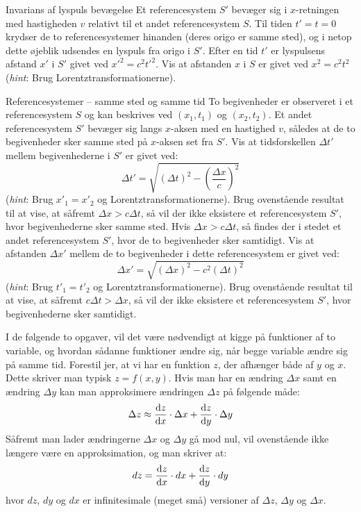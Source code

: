 \documentclass[crop=false, class=memoir]{standalone}
\begin{document}
\begin{opgave}[2]{Invarians af lyspuls bevægelse}
	Et referencesystem $S'$ bevæger sig i $x$-retningen med hastigheden $v$ relativt til et andet referencesystem $S$. Til tiden $t'=t=0$ krydser de to referencesystemer hinanden (deres origo er samme sted), og i netop dette øjeblik udsendes en lyspuls fra origo i $S'$. Efter en tid $t'$ er lyspulsens afstand $x'$ i $S'$ givet ved $x'^2 = c^2 t'^2$. 
	\opg Vis at afstanden $x$ i $S$ er givet ved $x^2 = c^2 t^2$ (\emph{hint}: Brug Lorentztransformationerne). 
\end{opgave}

\begin{opgave}[3]{Referencesystemer -- samme sted og samme tid}
	To begivenheder er observeret i et referencesystem $S$ og kan beskrives ved $\left( x_1 , t_1 \right)$ og $\left( x_2 , t_2 \right)$. Et andet referencesystem $S'$ bevæger sig langs $x$-aksen med en hastighed $v$, således at de to begivenheder sker samme sted på $x$-aksen set fra $S'$.
	\opg Vis at tidsforskellen $\Delta t'$ mellem begivenhederne i $S'$ er givet ved:
	$$\Delta t' = \sqrt{\left( \Delta t \right)^2 - \left( \frac{\Delta x}{c} \right)^2}$$
	(\emph{hint}: Brug $x'_1 = x'_2$ og Lorentztransformationerne).
	\opg Brug ovenstående resultat til at vise, at såfremt $\Delta x > c \Delta t$, så vil der ikke eksistere et referencesystem $S'$, hvor begivenhederne sker samme sted.
	\opg Hvis $\Delta x > c \Delta t$, så findes der i stedet et andet referencesystem $S'$, hvor de to begivenheder sker samtidigt. Vis at afstanden $\Delta x'$ mellem de to begivenheder i dette referencesystem er givet ved:
	$$\Delta x' = \sqrt{\left( \Delta x \right)^2 - c^2 \left( \Delta t \right)^2}$$
	(\emph{hint}: Brug $t'_1 = t'_2$ og Lorentztransformationerne).
	\opg Brug ovenstående resultat til at vise, at såfremt $c \Delta t > \Delta x$, så vil der ikke eksistere et referencesystem $S'$, hvor begivenhederne sker samtidigt.
\end{opgave}


I de følgende to opgaver, vil det være nødvendigt at kigge på funktioner af to variable, og hvordan sådanne funktioner ændre sig, når begge variable ændre sig på samme tid. 
Forestil jer, at  vi har en funktion $z$, der afhænger både af $y$ og $x$. Dette skriver man typisk $z=f \left( x,y \right)$. Hvis man har en ændring $\Delta x$ samt en ændring $\Delta y$ kan man approksimere ændringen $\Delta z$ på følgende måde:
%
$$\Delta z \approx \dv{z}{x} \cdot \Delta x + \dv{z}{y} \cdot \Delta y$$
%
Såfremt man lader ændringerne $\Delta x$ og $\Delta y$ gå mod nul, vil ovenstående ikke længere være en approksimation, og man skriver at:
%
$$dz = \dv{z}{x} \cdot dx + \dv{z}{y} \cdot dy$$
%
hvor $dz$, $dy$ og $dx$ er infinitesimale (meget små) versioner af $\Delta z$, $\Delta y$ og $\Delta x$.\\
\end{document}
